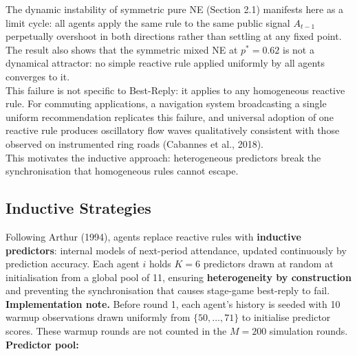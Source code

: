 \documentclass[letterpaper]{article}
\begin{document}
The dynamic instability of symmetric pure NE (Section 2.1) manifests here as a limit cycle: all agents apply the same rule to the same public signal $A_{t-1}$ perpetually overshoot in both directions rather than settling at any fixed point. The result also shows that the symmetric mixed NE at $p^*=0.62$ is not a dynamical attractor: no simple reactive rule applied uniformly by all agents converges to it. \\

This failure is not specific to Best-Reply: it applies to any homogeneous reactive rule. For commuting applications, a navigation system broadcasting a single uniform recommendation replicates this failure, and universal adoption of one reactive rule produces oscillatory flow waves qualitatively consistent with those observed on instrumented ring roads (Cabannes et al., 2018). \\

This motivates the inductive approach: heterogeneous predictors break the synchronisation that homogeneous rules cannot escape. \\

\subsection{Inductive Strategies}

Following Arthur (1994), agents replace reactive rules with \textbf{inductive predictors}: internal models of next-period attendance, updated continuously by prediction accuracy. Each agent $i$ holds $K=6$ predictors drawn at random at initialisation from a global pool of 11, ensuring \textbf{heterogeneity by construction} and preventing the synchronisation that causes stage-game best-reply to fail. \\

\textbf{Implementation note.} Before round 1, each agent's history is seeded with 10 warmup observations drawn uniformly from $\{50, \ldots, 71\}$ to initialise predictor scores. These warmup rounds are not counted in the $M=200$ simulation rounds. \\

\textbf{Predictor pool:} \\
\end{document}
